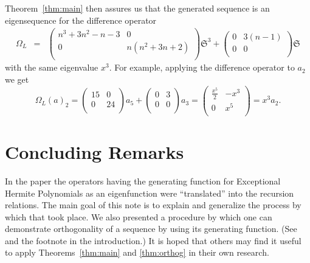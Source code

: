 \documentclass{amsart}
\theoremstyle{definition}
\theoremstyle{remark}
\numberwithin{equation}{section}
\def\S{\mathfrak{S}}
\begin{document}
Theorem~\ref{thm:main} then assures us that the generated sequence is
an eigensequence for the difference operator
\begin{eqnarray*}
\Omega_L&=&\left(
\begin{array}{cc}
 n^3+3 n^2-n-3 & 0 \\
 0 & n \left(n^2+3 n+2\right) \\
\end{array}
\right)
\S^3+\left(
\begin{array}{cc}
 0 & 3 (n-1) \\
 0 & 0 \\
\end{array}
\right)
\S
\end{eqnarray*}
with the same eigenvalue $x^3$.
For example, applying the difference operator to $a_2$ we get
$$
\Omega_L(a)_2=\left(
\begin{array}{cc}
 15 &0 \\
 0 & 24 \\
\end{array}
\right)a_5+\left(
\begin{array}{cc}
0 &3 \\
 0 & 0 \\
\end{array}
\right)a_3
=\left(
\begin{array}{cc}
 \frac{x^5}{2} & -x^3 \\
 0 & x^5 \\
\end{array}
\right)=x^3a_2.
$$


\section{Concluding Remarks}

In the paper \cite{MilsonKasman2020} the operators having the
generating function for Exceptional Hermite Polynomials as an
eigenfunction were ``translated'' into the recursion relations.   The
main 
goal of this note is to explain and generalize the process by which that took place.
We also presented a procedure by which one can demonstrate
orthogonality of a sequence by using its generating function.  (See
\cite{usedit} and the footnote in the introduction.)
It is hoped that others may find it useful to apply
Theorems~\ref{thm:main} and \ref{thm:orthog} in their own research.
\end{document}
